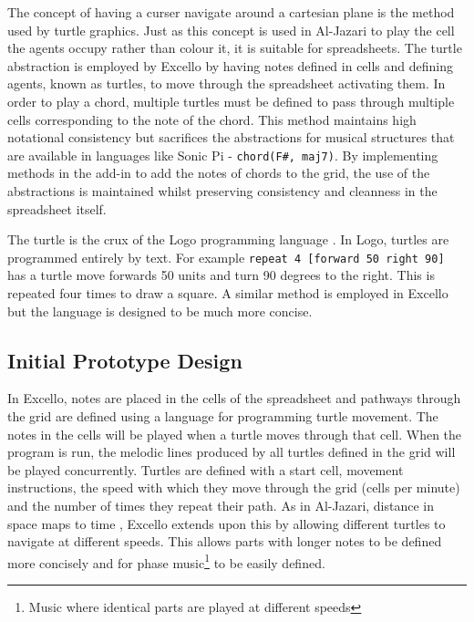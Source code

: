 \documentclass{article}
\begin{document}
\newcommand\upquote[1]{\textquotesingle#1\textquotesingle}
The concept of having a curser navigate around a cartesian plane is the method used by turtle graphics. Just as this concept is used in Al-Jazari to play the cell the agents occupy rather than colour it, it is suitable for spreadsheets. The turtle abstraction is employed by Excello by having notes defined in cells and defining agents, known as turtles, to move through the spreadsheet activating them. In order to play a chord, multiple turtles must be defined to pass through multiple cells corresponding to the note of the chord. This method maintains high notational consistency but sacrifices the abstractions for musical structures that are available in languages like Sonic Pi - \texttt{chord(\upquote{F\#}, \upquote{maj7})}. By implementing methods in the add-in to add the notes of chords to the grid, the use of the abstractions is maintained whilst preserving consistency and cleanness in the spreadsheet itself.

The turtle is the crux of the Logo programming language \cite{goldman:turtle}. In Logo, turtles are programmed entirely by text. For example \texttt{repeat 4 [forward 50 right 90]} has a turtle move forwards 50 units and turn 90 degrees to the right. This is repeated four times to draw a square. A similar method is employed in Excello but the language is designed to be much more concise.

\subsection{Initial Prototype Design}

In Excello, notes are placed in the cells of the spreadsheet and pathways through the grid are defined using a language for programming turtle movement. The notes in the cells will be played when a turtle moves through that cell. When the program is run, the melodic lines produced by all turtles defined in the grid will be played concurrently. Turtles are defined with a start cell, movement instructions, the speed with which they move through the grid (cells per minute) and the number of times they repeat their path. As in Al-Jazari, distance in space maps to time \cite{mclean:texture}, Excello extends upon this by allowing different turtles to navigate at different speeds. This allows parts with longer notes to be defined more concisely and for phase music\footnote{Music where identical parts are played at different speeds} to be easily defined.
\end{document}
